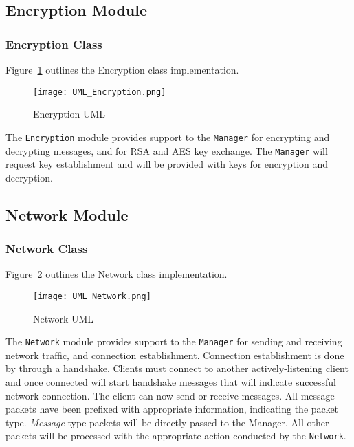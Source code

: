\documentclass[sigconf]{acmart}
\begin{document}
\subsection{Encryption Module}
\subsubsection{Encryption Class}
Figure~\ref{Encryption UML} outlines the Encryption class implementation.
\begin{figure}[htb]
 \begin{center}
  \texttt{[image: UML\_Encryption.png]}
  \caption{Encryption UML}
  \label{Encryption UML}
 \end{center}
\end{figure}
The \texttt{Encryption} module provides support to the \texttt{Manager} for encrypting and
decrypting messages, and for RSA and AES key exchange. The \texttt{Manager} will request key
establishment and will be provided with keys for encryption and decryption.

\subsection{Network Module}
\subsubsection{Network Class}
Figure~\ref{Network UML} outlines the Network class implementation.
\begin{figure}[htb]
 \begin{center}
  \texttt{[image: UML\_Network.png]}
  \caption{Network UML}
  \label{Network UML}
 \end{center}
\end{figure}
The \texttt{Network} module provides support to the \texttt{Manager} for sending and receiving
network traffic, and connection establishment. Connection establishment is done by through a
handshake. Clients must connect to another actively-listening client and once connected will start
handshake messages that will indicate successful network connection. The client can now send or
receive messages. All message packets have been prefixed with appropriate information, indicating
the packet type. \textit{Message}-type packets will be directly passed to the Manager. All other
packets will be processed with the appropriate action conducted by the \texttt{Network}.

\end{document}
